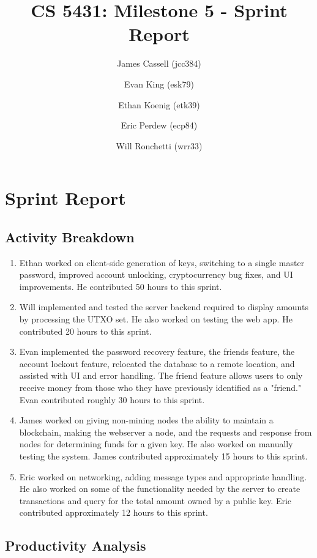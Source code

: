 \documentclass[a4paper,12pt]{article}
\title{CS 5431: Milestone 5 - Sprint Report}
\author{
James Cassell (jcc384)
\and
Evan King (esk79)
\and
Ethan Koenig (etk39)
\and
Eric Perdew (ecp84)
\and
Will Ronchetti (wrr33)
}
\begin{document}
\maketitle

\section{Sprint Report}

\subsection{Activity Breakdown}

\begin{enumerate} %
\item Ethan worked on client-side generation of keys, switching to a single master password, improved account unlocking, cryptocurrency bug fixes, and UI improvements. He contributed 50 hours to this sprint.
\item Will implemented and tested the server backend required to display amounts by processing the UTXO set. He also worked on testing the web app. He contributed 20 hours to this sprint.
\item Evan implemented the password recovery feature, the friends feature, the account lockout feature, relocated the database to a remote location, and assisted with UI and error handling. The friend feature allows users to only receive money from those who they have previously identified as a "friend." Evan contributed roughly 30 hours to this sprint.
\item James worked on giving non-mining nodes the ability to maintain a blockchain, making the webserver a node, and the requests and response from nodes for determining funds for a given key.
  He also worked on manually testing the system.
  James contributed approximately 15 hours to this sprint.
\item Eric worked on networking, adding message types and appropriate handling.
He also worked on some of the functionality needed by the server to create transactions and query for the total amount owned by a public key.
Eric contributed approximately 12 hours to this sprint.
\end{enumerate}

\subsection{Productivity Analysis}
\end{document}

